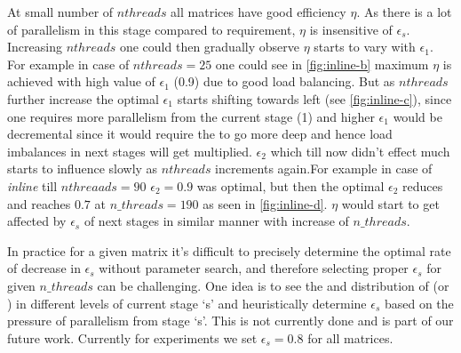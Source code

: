 At small number of $nthreads$ all matrices have good efficiency $\eta$. As there is a lot of parallelism in this stage compared to requirement, $\eta$ is insensitive of $\epsilon_s$. Increasing $nthreads$ one could then gradually observe $\eta$ starts to vary with $\epsilon_1$. For example in case of $nthreads = 25$ one could see in \cref{fig:inline-b} maximum $\eta$ is achieved with high value of $\epsilon_1$ (0.9) due to good load balancing. But as $nthreads$ further increase the optimal $\epsilon_1$ starts shifting towards left (see \cref{fig:inline-c}),
 since one requires more parallelism from the current stage (1) and higher $\epsilon_1$ would be decremental since it would require the \levelTree to go more deep and hence load imbalances in next stages will get multiplied. $\epsilon_2$ which till now didn't effect much starts to influence slowly as $nthreads$ increments again.For example in case of \emph{inline} till $nthreaads=90$ $\epsilon_2=0.9$ was optimal, but then the optimal $\epsilon_2$ reduces and reaches $0.7$ at $n\_threads=190$ as seen in \cref{fig:inline-d}. $\eta$ would start to get affected by $\epsilon_s$ of next stages in similar manner with increase of $n\_threads$.
 
In practice for a given matrix it's difficult to precisely determine the optimal rate of decrease in $\epsilon_s$ without parameter search, and therefore selecting proper $\epsilon_s$ for given $n\_threads$ can be challenging. One idea is to see the \totalLvl and distribution of \nrows (or \nnz) in different levels of current stage `s' and heuristically determine $\epsilon_s$ based on the pressure of parallelism from stage `s'. This is not currently done and is part of our future work. Currently for experiments we set $\epsilon_s=0.8$ for all matrices.


